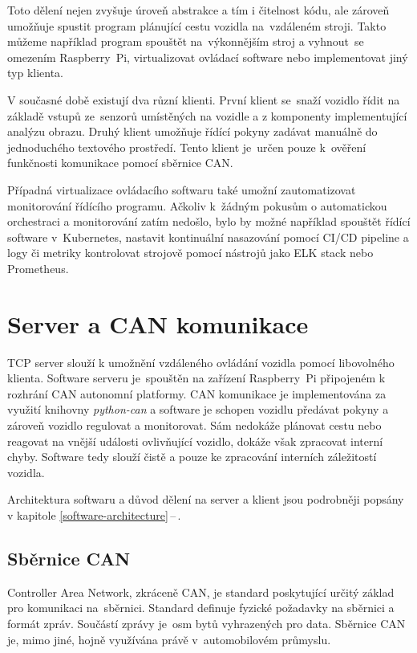 \documentclass[czech, bachelor]{diploma}
\newcommand{\peteref}[1]{\ref{#1}\,--\,\nameref{#1}}
\begin{document}
Toto dělení nejen zvyšuje úroveň abstrakce a tím i čitelnost kódu, ale zároveň umožňuje spustit program plánující cestu vozidla
na~vzdáleném stroji. Takto můžeme například program spouštět na~výkonnějším stroj a vyhnout~se omezením Raspberry~Pi,
virtualizovat ovládací software\cite{virtualization-source} nebo implementovat jiný typ klienta.

V současné době existují dva různí klienti. První klient se~snaží vozidlo řídit na základě vstupů ze~senzorů umístěných na vozidle
a z komponenty implementující analýzu obrazu. Druhý klient umožňuje řídící pokyny zadávat manuálně do jednoduchého textového
prostředí. Tento klient je~určen pouze k~ověření funkčnosti komunikace pomocí sběrnice CAN.

Případná virtualizace ovládacího softwaru\cite{virtualization-source} také umožní zautomatizovat monitorování řídícího
programu\cite{prometheus-source, elk-source}. Ačkoliv k~žádným pokusům o automatickou orchestraci a monitorování zatím nedošlo,
bylo by možné například spouštět řídící software v~Kubernetes\cite{virtualization-source}, nastavit kontinuální nasazování pomocí CI/CD
pipeline\cite{cicd-source} a logy či metriky kontrolovat strojově pomocí nástrojů jako ELK stack\cite{elk-source} nebo
Prometheus\cite{prometheus-source}.

\chapter{Server a CAN komunikace}

TCP server slouží k umožnění vzdáleného ovládání vozidla pomocí libovolného klienta. Software serveru je~spouštěn na zařízení
Raspberry~Pi připojeném k rozhrání CAN autonomní platformy. CAN komunikace je implementována za využití knihovny \emph{python-can}
a software je schopen vozidlu předávat pokyny a zároveň vozidlo regulovat a monitorovat. Sám nedokáže plánovat cestu nebo reagovat
na vnější události ovlivňující vozidlo, dokáže však zpracovat interní chyby. Software tedy slouží čistě a pouze ke zpracování
interních záležitostí vozidla.

Architektura softwaru a důvod dělení na server a klient jsou podrobněji popsány v kapitole \peteref{software-architecture}.

\section{Sběrnice CAN}

Controller Area Network\cite{can-source}, zkráceně CAN, je standard poskytující určitý základ pro komunikaci na~sběrnici.
Standard definuje fyzické požadavky na sběrnici a formát zpráv. Součástí zprávy je~osm bytů vyhrazených pro data. Sběrnice CAN je,
mimo jiné, hojně využívána právě v~automobilovém průmyslu.
\end{document}
